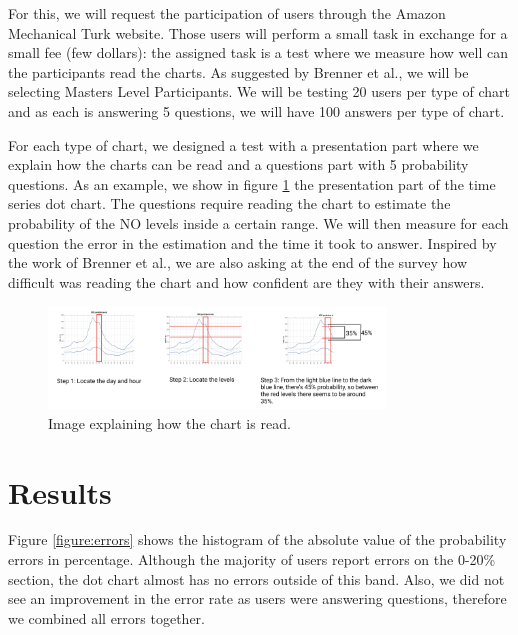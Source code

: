 \documentclass[a4paper,3p,sort&compress]{elsarticle}
\begin{document}
For this, we will request the participation of users through the Amazon Mechanical Turk website. Those users will perform a small task
in exchange for a small fee (few dollars): the assigned task is a test where we measure how well can the participants read the charts.
As suggested by Brenner et al., we will be selecting Masters Level Participants. We will be testing 20 users per type of chart 
and as each is answering 5 questions, we will have 100 answers per type of chart.

For each type of chart, we designed a test with a presentation part where we explain how the charts can be read and a questions part
with 5 probability questions. As an example, we show in figure \ref{figure:explanation} the presentation part of the time series 
dot chart. The questions
require reading the chart to estimate the probability of the NO levels inside a certain range. We will then measure for each question
the error in the estimation and the time it took to answer. Inspired by the work of Brenner et al., we are also asking at the end of 
the survey how difficult was reading the chart and how confident are they with their answers. 

\begin{figure}
  \centering
  \includegraphics[width=0.8\textwidth]{dot_explanation}
  \caption{\label{figure:explanation} Image explaining how the chart is read.  }
\end{figure} 

\section{Results}
\label{sec:results}

Figure \ref{figure:errors} shows the histogram of the absolute value of the probability errors in percentage. 
Although the majority 
of users report errors on the 0-20\% section, the dot chart almost has no errors outside of this band. 
Also, we did not see an improvement in 
the error rate as users were answering questions, therefore we combined all errors together.
\end{document}
